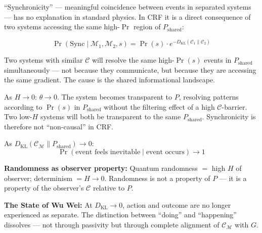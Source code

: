 \documentclass[12pt, a4paper]{article}
\begin{document}
\begin{derivedbox}[title={Synchronicity Formula (Session 6.12)}]
``Synchronicity'' --- meaningful coincidence between events in separated systems --- has
no explanation in standard physics. In CRF it is a direct consequence of two systems
accessing the same high-$\Pr$ region of $P_{\mathrm{shared}}$:

\[
  \Pr(\mathrm{Sync} \mid \mathcal{M}_1, \mathcal{M}_2, s)
  = \Pr(s)\cdot e^{-D_{\mathrm{KL}}(\mathcal{C}_1\|\mathcal{C}_2)}
\]

Two systems with similar $\mathcal{C}$ will resolve the same high-$\Pr(s)$ events in
$P_{\mathrm{shared}}$ simultaneously --- not because they communicate, but because they
are accessing the same gradient. The cause is the shared informational landscape.

As $H \to 0$: $\theta \to 0$. The system becomes transparent to $P$, resolving patterns
according to $\Pr(s)$ in $P_{\mathrm{shared}}$ without the filtering effect of a high
$\mathcal{C}$-barrier. Two low-$H$ systems will both be transparent to the same
$P_{\mathrm{shared}}$. Synchronicity is therefore not ``non-causal'' in CRF.
\end{derivedbox}

\begin{derivedbox}[title={Inevitability Theorem (Session 6.13)}]
As $D_{\mathrm{KL}}(\mathcal{C}_\mathcal{M}\|P_{\mathrm{shared}}) \to 0$:
\[
  \Pr\!\left(\text{event feels inevitable} \mid \text{event occurs}\right) \to 1
\]

\textbf{Randomness as observer property:} Quantum randomness $= $ high $H$ of observer;
determinism $= H \to 0$. Randomness is not a property of $P$ --- it is a property of
the observer's $\mathcal{C}$ relative to $P$.

\textbf{The State of Wu Wei:} At $D_{\mathrm{KL}} \to 0$, action and outcome are no
longer experienced as separate. The distinction between ``doing'' and ``happening''
dissolves --- not through passivity but through complete alignment of $\mathcal{C}_\mathcal{M}$
with $G$.
\end{derivedbox}
\end{document}
